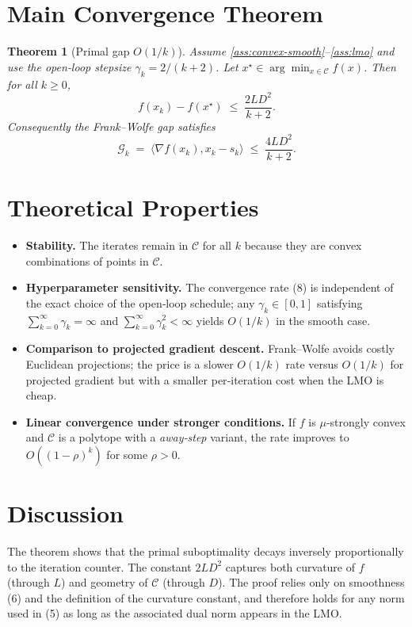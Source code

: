\documentclass{article}
\newtheorem{theorem}{Theorem}
\newcommand{\gap}{\mathcal{G}}
\begin{document}
\section*{Main Convergence Theorem}
\begin{theorem}[Primal gap $O(1/k)$]\label{thm:fw-rate}
Assume \ref{ass:convex-smooth}–\ref{ass:lmo} and use the open‑loop stepsize $\gamma_k=2/(k+2)$.  
Let $x^\star\in\arg\min_{x\in\mathcal{C}}f(x)$. Then for all $k\ge 0$,
\[
f(x_k)-f(x^\star)\;\le\;\frac{2L D^{2}}{k+2}.
\tag{8}
\]
Consequently the Frank–Wolfe gap satisfies
\[
\gap_k \;=\;\langle \nabla f(x_k),x_k-s_k\rangle \;\le\; \frac{4L D^{2}}{k+2}.
\tag{9}
\]
\end{theorem}

\section*{Theoretical Properties}
\begin{itemize}
\item \textbf{Stability.} The iterates remain in $\mathcal{C}$ for all $k$ because they are convex combinations of points in $\mathcal{C}$.
\item \textbf{Hyperparameter sensitivity.} The convergence rate (8) is independent of the exact choice of the open‑loop schedule; any $\gamma_k\in[0,1]$ satisfying $\sum_{k=0}^\infty \gamma_k=\infty$ and $\sum_{k=0}^\infty \gamma_k^2<\infty$ yields $O(1/k)$ in the smooth case.
\item \textbf{Comparison to projected gradient descent.} Frank–Wolfe avoids costly Euclidean projections; the price is a slower $O(1/k)$ rate versus $O(1/k)$ for projected gradient but with a smaller per‑iteration cost when the LMO is cheap.
\item \textbf{Linear convergence under stronger conditions.} If $f$ is $\mu$‑strongly convex and $\mathcal{C}$ is a polytope with a \emph{away‑step} variant, the rate improves to $O((1-\rho)^k)$ for some $\rho>0$.
\end{itemize}

\section*{Discussion}
The theorem shows that the primal suboptimality decays inversely proportionally to the iteration counter. The constant $2LD^2$ captures both curvature of $f$ (through $L$) and geometry of $\mathcal{C}$ (through $D$). The proof relies only on smoothness (6) and the definition of the curvature constant, and therefore holds for any norm used in (5) as long as the associated dual norm appears in the LMO.
\end{document}
